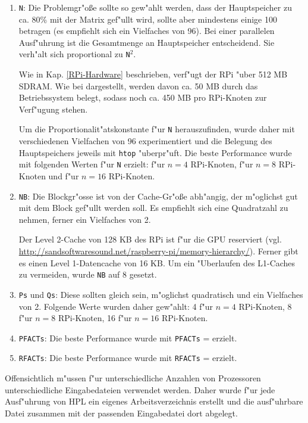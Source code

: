\begin{enumerate} 
	\item \texttt{N}: Die Problemgr"o\ss e sollte so gew"ahlt werden, dass der Hauptspeicher zu ca. 80\% mit der Matrix gef"ullt wird, sollte aber mindestens einige 100 betragen (es empfiehlt sich ein Vielfaches von 96). Bei einer parallelen Ausf"uhrung ist die Gesamtmenge an Hauptspeicher entscheidend. Sie verh"alt sich proportional zu \texttt{N}$^2$. 
	
Wie in Kap. \ref{RPi-Hardware} beschrieben, verf"ugt der RPi "uber 512 MB SDRAM. Wie bei \cite{kli13} dargestellt, werden davon ca. 50 MB durch das Betriebssystem belegt, sodass noch ca. 450 MB pro RPi-Knoten zur Verf"ugung stehen. 

Um die Proportionalit"atskonstante f"ur \texttt{N} herauszufinden, wurde daher mit verschiedenen Vielfachen von 96 experimentiert und die Belegung des Hauptspeichers jeweils mit \texttt{htop} "uberpr"uft. Die beste Performance wurde mit folgenden Werten f"ur \texttt{N} erzielt: 
f"ur $n=4$ RPi-Knoten, %
f"ur $n=8$ RPi-Knoten und %
f"ur $n=16$ RPi-Knoten.
	\item \texttt{NB}: Die Blockgr"osse ist von der Cache-Gr"o\ss e abh"angig, der m"oglichst gut mit dem Block gef"ullt werden soll. Es empfiehlt sich eine Quadratzahl zu nehmen, ferner ein Vielfaches von 2. 

Der Level 2-Cache von 128 KB des RPi ist f"ur die GPU reserviert (vgl. \url{http://sandsoftwaresound.net/raspberry-pi/memory-hierarchy/}). Ferner gibt es einen Level 1-Datencache von 16 KB. Um ein "Uberlaufen des L1-Caches zu vermeiden, wurde \texttt{NB} auf 8 gesetzt. 
	\item \texttt{Ps} und \texttt{Qs}: Diese sollten gleich sein, m"oglichst quadratisch und ein Vielfaches von 2. Folgende Werte wurden daher gew"ahlt: 4 f"ur $n=4$ RPi-Knoten, 8 f"ur $n=8$ RPi-Knoten, 16 f"ur $n=16$ RPi-Knoten.
	\item \texttt{PFACTs}: Die beste Performance wurde mit \texttt{PFACTs} = erzielt. %
	\item \texttt{RFACTs}: Die beste Performance wurde mit \texttt{RFACTs} = erzielt. %
\end{enumerate}
Offensichtlich m"ussen f"ur unterschiedliche Anzahlen von Prozessoren unterschiedliche Eingabedateien verwendet werden. Daher wurde f"ur jede Ausf"uhrung von HPL ein eigenes Arbeitsverzeichnis erstellt und die ausf"uhrbare Datei zusammen mit der passenden Eingabedatei dort abgelegt. 

